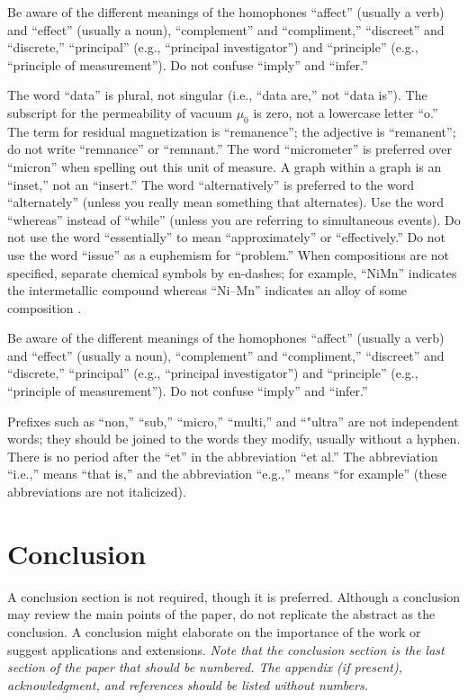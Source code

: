 \documentclass[conf]{new-aiaa}
\begin{document}
Be aware of the different meanings of the homophones ``affect'' (usually a verb) and ``effect'' (usually a noun), ``complement'' and ``compliment,'' ``discreet'' and ``discrete,'' ``principal'' (e.g., ``principal investigator'') and ``principle'' (e.g., ``principle of measurement''). Do not confuse ``imply'' and ``infer.''

The word ``data'' is plural, not singular (i.e., ``data are,'' not ``data is''). The subscript for the permeability of vacuum $\mu_0$ is zero, not a lowercase letter ``o.'' The term for residual magnetization is ``remanence''; the adjective is ``remanent''; do not write ``remnance'' or ``remnant.'' The word ``micrometer'' is preferred over ``micron'' when spelling out this unit of measure. A graph within a graph is an ``inset,'' not an ``insert.'' The word ``alternatively'' is preferred to the word ``alternately'' (unless you really mean something that alternates). Use the word ``whereas'' instead of ``while'' (unless you are referring to simultaneous events). Do not use the word ``essentially'' to mean ``approximately'' or ``effectively.'' Do not use the word ``issue'' as a euphemism for ``problem.'' When compositions are not specified, separate chemical symbols by en-dashes; for example, ``NiMn'' indicates the intermetallic compound  whereas ``Ni--Mn'' indicates an alloy of some composition .

Be aware of the different meanings of the homophones ``affect'' (usually a verb) and ``effect'' (usually a noun), ``complement'' and ``compliment,'' ``discreet'' and ``discrete,'' ``principal'' (e.g., ``principal investigator'') and ``principle'' (e.g., ``principle of measurement''). Do not confuse ``imply'' and ``infer.''

Prefixes such as ``non,'' ``sub,'' ``micro,'' ``multi,'' and ``"ultra'' are not independent words; they should be joined to the words they modify, usually without a hyphen. There is no period after the ``et'' in the abbreviation ``et al.'' The abbreviation ``i.e.,'' means ``that is,'' and the abbreviation ``e.g.,'' means ``for example'' (these abbreviations are not italicized).


\section{Conclusion}
A conclusion section is not required, though it is preferred. Although a conclusion may review the main points of the paper, do not replicate the abstract as the conclusion. A conclusion might elaborate on the importance of the work or suggest applications and extensions. \textit{Note that the conclusion section is the last section of the paper that should be numbered. The appendix (if present), acknowledgment, and references should be listed without numbers.}
\end{document}
